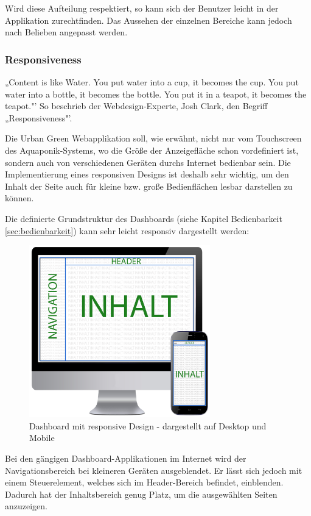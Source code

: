 Wird diese Aufteilung respektiert, so kann sich der Benutzer leicht in der Applikation zurechtfinden. Das Aussehen der einzelnen Bereiche kann jedoch nach Belieben angepasst werden.
\clearpage
\subsubsection{Responsiveness}
„Content is like Water. You put water into a cup, it becomes the cup. You put water into a bottle, it becomes the bottle. You put it in a teapot, it becomes the teapot."' So beschrieb der Webdesign-Experte, Josh Clark, den Begriff „Responsiveness"'. \cite{responsiveness}

Die Urban Green Webapplikation soll, wie erwähnt, nicht nur vom Touchscreen des Aquaponik-Systems, wo die Größe der Anzeigefläche schon vordefiniert ist, sondern auch von verschiedenen Geräten durchs Internet bedienbar sein. Die Implementierung eines responsiven Designs ist deshalb sehr wichtig, um den Inhalt der Seite auch für kleine bzw. große Bedienflächen lesbar darstellen zu können.

Die definierte Grundstruktur des Dashboards (siehe Kapitel Bedienbarkeit  \ref{sec:bedienbarkeit}) kann sehr leicht responsiv dargestellt werden:

\begin{figure}[ht]
    \centering
	\includegraphics[width=0.7\textwidth]{images/dashboard-structure-responsive}
	\caption{Dashboard mit responsive Design - dargestellt auf Desktop und Mobile}
\end{figure}

Bei den gängigen Dashboard-Applikationen im Internet wird der Navigationsbereich bei kleineren Geräten ausgeblendet. Er lässt sich jedoch mit einem Steuerelement, welches sich im Header-Bereich befindet, einblenden. Dadurch hat der Inhaltsbereich genug Platz, um die ausgewählten Seiten anzuzeigen.

